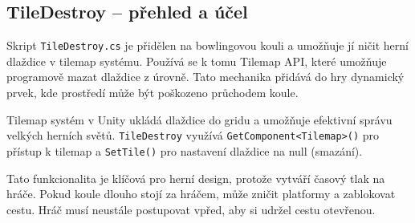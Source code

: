 \subsection{TileDestroy -- přehled a účel}

Skript \texttt{TileDestroy.cs} je přidělen na bowlingovou kouli a umožňuje jí ničit herní dlaždice v tilemap systému. Používá se k tomu Tilemap API, které umožňuje programově mazat dlaždice z úrovně. Tato mechanika přidává do hry dynamický prvek, kde prostředí může být poškozeno průchodem koule.

Tilemap systém v Unity ukládá dlaždice do gridu a umožňuje efektivní správu velkých herních světů. \texttt{TileDestroy} využívá \texttt{GetComponent<Tilemap>()} pro přístup k tilemap a \texttt{SetTile()} pro nastavení dlaždice na null (smazání).

Tato funkcionalita je klíčová pro herní design, protože vytváří časový tlak na hráče. Pokud koule dlouho stojí za hráčem, může zničit platformy a zablokovat cestu. Hráč musí neustále postupovat vpřed, aby si udržel cestu otevřenou.